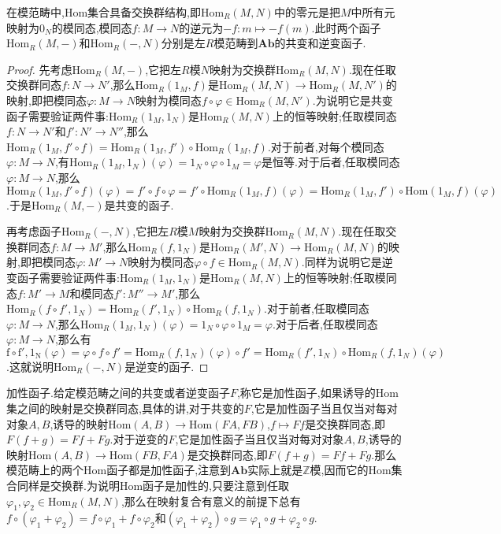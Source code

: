 在模范畴中,Hom集合具备交换群结构,即$\mathrm{Hom}_R(M,N)$中的零元是把$M$中所有元映射为$0_N$的模同态,模同态$f:M\to N$的逆元为$-f:m\mapsto -f(m)$.此时两个函子$\mathrm{Hom}_R(M,-)$和$\mathrm{Hom}_R(-,N)$分别是左$R$模范畴到$\textbf{Ab}$的共变和逆变函子.
\begin{proof}
	
	先考虑$\mathrm{Hom}_R(M,-)$,它把左$R$模$N$映射为交换群$\mathrm{Hom}_R(M,N)$.现在任取交换群同态$f:N\to N'$,那么$\mathrm{Hom}_R(1_M,f)$是$\mathrm{Hom}_R(M,N)\to\mathrm{Hom}_R(M,N')$的映射,即把模同态$\varphi:M\to N$映射为模同态$f\circ\varphi\in\mathrm{Hom}_R(M,N')$.为说明它是共变函子需要验证两件事:$\mathrm{Hom}_R(1_M,1_N)$是$\mathrm{Hom}_R(M,N)$上的恒等映射;任取模同态$f:N\to N'$和$f':N'\to N''$,那么$\mathrm{Hom}_R(1_M,f'\circ f)=\mathrm{Hom}_R(1_M,f')\circ\mathrm{Hom}_R(1_M,f)$.对于前者,对每个模同态$\varphi:M\to N$,有$\mathrm{Hom}_R(1_M,1_N)(\varphi)=1_N\circ\varphi\circ1_M=\varphi$是恒等.对于后者,任取模同态$\varphi:M\to N$,那么$\mathrm{Hom}_R(1_M,f'\circ f)(\varphi)=f'\circ f\circ\varphi=f'\circ\mathrm{Hom}_R(1_M,f)(\varphi)=\mathrm{Hom}_R(1_M,f')\circ\mathrm{Hom}(1_M,f)(\varphi)$.于是$\mathrm{Hom}_R(M,-)$是共变的函子.
	
	再考虑函子$\mathrm{Hom}_R(-,N)$,它把左$R$模$M$映射为交换群$\mathrm{Hom}_R(M,N)$.现在任取交换群同态$f:M\to M'$,那么$\mathrm{Hom}_R(f,1_N)$是$\mathrm{Hom}_R(M',N)\to\mathrm{Hom}_R(M,N)$的映射,即把模同态$\varphi:M'\to N$映射为模同态$\varphi\circ f\in\mathrm{Hom}_R(M,N)$.同样为说明它是逆变函子需要验证两件事:$\mathrm{Hom}_R(1_M,1_N)$是$\mathrm{Hom}_R(M,N)$上的恒等映射;任取模同态$f:M'\to M$和模同态$f':M''\to M'$,那么$\mathrm{Hom}_R(f\circ f',1_N)=\mathrm{Hom}_R(f',1_N)\circ\mathrm{Hom}_R(f,1_N)$.对于前者,任取模同态$\varphi:M\to N$,那么$\mathrm{Hom}_R(1_M,1_N)(\varphi)=1_N\circ\varphi\circ1_M=\varphi$.对于后者,任取模同态$\varphi:M\to N$,那么有$\mathrm{f\circ f',1_N}(\varphi)=\varphi\circ f\circ f'=\mathrm{Hom}_R(f,1_N)(\varphi)\circ f'=\mathrm{Hom}_R(f',1_N)\circ\mathrm{Hom}_R(f,1_N)(\varphi)$.这就说明$\mathrm{Hom}_R(-,N)$是逆变的函子.
\end{proof}

加性函子.给定模范畴之间的共变或者逆变函子$F$,称它是加性函子,如果诱导的Hom集之间的映射是交换群同态,具体的讲,对于共变的$F$,它是加性函子当且仅当对每对对象$A,B$,诱导的映射$\mathrm{Hom}(A,B)\to\mathrm{Hom}(FA,FB)$,$f\mapsto Ff$是交换群同态,即$F(f+g)=Ff+Fg$.对于逆变的$F$,它是加性函子当且仅当对每对对象$A,B$,诱导的映射$\mathrm{Hom}(A,B)\to\mathrm{Hom}(FB,FA)$是交换群同态,即$F(f+g)=Ff+Fg$.那么模范畴上的两个Hom函子都是加性函子,注意到$\textbf{Ab}$实际上就是$\mathbb{Z}$模,因而它的Hom集合同样是交换群.为说明Hom函子是加性的,只要注意到任取$\varphi_1,\varphi_2\in\mathrm{Hom}_R(M,N)$,那么在映射复合有意义的前提下总有$f\circ(\varphi_1+\varphi_2)=f\circ\varphi_1+f\circ\varphi_2$和$(\varphi_1+\varphi_2)\circ g=\varphi_1\circ g+\varphi_2\circ g$.

